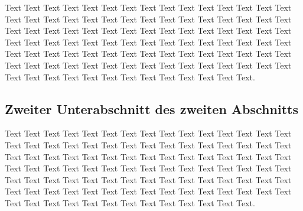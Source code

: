 \documentclass[final, english, ngerman, a4paper, 12pt, %
numbers=noenddot,
cd=true,
cdfont=false,cdfont=nohead,cdfont=nodin,
cdmath=false,
cdhead=false,
cdfoot=true,
cdcover=monochrome,
cdgeometry=symmetric,
declaration=heading,
declaration=notoc,
abstract=heading,
]{tudscrreprt}
\begin{document}
Text Text Text Text Text Text Text Text Text Text Text Text Text Text Text Text Text Text Text Text Text Text Text Text Text Text Text Text Text Text Text Text Text Text Text Text Text Text Text Text Text Text Text Text Text Text Text Text Text Text Text Text Text Text Text Text Text Text Text Text Text Text Text Text Text Text Text Text Text Text Text Text Text Text Text Text Text Text Text Text Text Text Text Text Text Text Text Text Text Text Text Text Text Text Text Text Text Text Text Text Text Text Text.

\subsection*{Zweiter Unterabschnitt des zweiten Abschnitts}

Text Text Text Text Text Text Text Text Text Text Text Text Text Text Text Text Text Text Text Text Text Text Text Text Text Text Text Text Text Text Text Text Text Text Text Text Text Text Text Text Text Text Text Text Text Text Text Text Text Text Text Text Text Text Text Text Text Text Text Text Text Text Text Text Text Text Text Text Text Text Text Text Text Text Text Text Text Text Text Text Text Text Text Text Text Text Text Text Text Text Text Text Text Text Text Text Text Text Text Text Text Text Text.





\clearpage

\printbibliography
\end{document}
